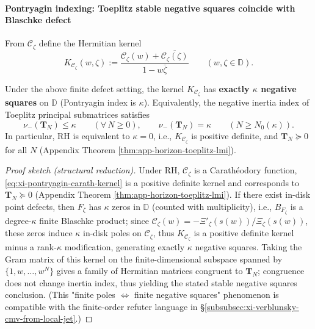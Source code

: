 \paragraph{Pontryagin indexing: Toeplitz stable negative squares coincide with Blaschke defect}
From \(\mathscr{C}_{\zeta}\) define the Hermitian kernel
\begin{equation}\label{eq:xi-pontryagin-carath-kernel}
\boxed{\;
K_{\mathscr{C}_{\zeta}}(w,\zeta)
:=\frac{\mathscr{C}_{\zeta}(w)+\overline{\mathscr{C}_{\zeta}(\zeta)}}{1-w\overline{\zeta}}
\qquad(w,\zeta\in\mathbb{D}).\;}
\end{equation}

\begin{theorem}[Toeplitz negative squares index \(=\) Blaschke defect dimension]\label{thm:xi-toeplitz-negative-squares-equals-blaschke-defect}
Under the above finite defect setting, the kernel \(K_{\mathscr{C}_{\zeta}}\) has \textbf{exactly \(\kappa\) negative squares} on \(\mathbb{D}\) (Pontryagin index is \(\kappa\)).
Equivalently, the negative inertia index of Toeplitz principal submatrices satisfies
\[
\nu_-(\mathbf{T}_N)\le \kappa\qquad(\forall\,N\ge 0),
\qquad
\nu_-(\mathbf{T}_N)=\kappa\qquad(N\ge N_0(\kappa)).
\]
In particular, RH is equivalent to \(\kappa=0\), i.e., \(K_{\mathscr{C}_{\zeta}}\) is positive definite, and \(\mathbf{T}_N\succeq 0\) for all \(N\) (Appendix Theorem \ref{thm:app-horizon-toeplitz-lmi}).
\end{theorem}

\begin{proof}[Proof sketch (structural reduction)]
Under RH, \(\mathscr{C}_{\zeta}\) is a Carathéodory function, \eqref{eq:xi-pontryagin-carath-kernel} is a positive definite kernel and corresponds to \(\mathbf{T}_N\succeq 0\) (Appendix Theorem \ref{thm:app-horizon-toeplitz-lmi}).
If there exist in-disk point defects, then \(F_{\zeta}\) has \(\kappa\) zeros in \(\mathbb{D}\) (counted with multiplicity), i.e., \(B_{F_{\zeta}}\) is a degree-\(\kappa\) finite Blaschke product;
since \(\mathscr{C}_{\zeta}(w)=-\Xi'_{\zeta}(s(w))/\Xi_{\zeta}(s(w))\), these zeros induce \(\kappa\) in-disk poles on \(\mathscr{C}_{\zeta}\), thus \(K_{\mathscr{C}_{\zeta}}\) is a positive definite kernel minus a rank-\(\kappa\) modification, generating exactly \(\kappa\) negative squares.
Taking the Gram matrix of this kernel on the finite-dimensional subspace spanned by \(\{1,w,\dots,w^N\}\) gives a family of Hermitian matrices congruent to \(\mathbf{T}_N\); congruence does not change inertia index, thus yielding the stated stable negative squares conclusion.
(This "finite poles \(\Leftrightarrow\) finite negative squares" phenomenon is compatible with the finite-order refuter language in \S\ref{subsubsec:xi-verblunsky-cmv-from-local-jet}.)
\end{proof}

